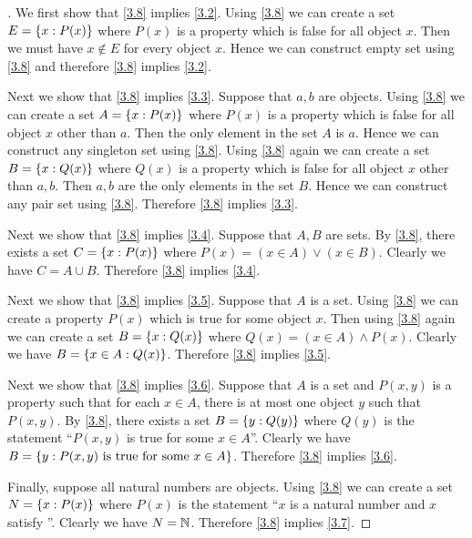 \begin{proof}[]
  We first show that \cref{3.8} implies \cref{3.2}.
  Using \cref{3.8} we can create a set \(E = \left\lbrace x : P(x)\right\rbrace\) where \(P(x)\) is a property which is false for all object \(x\).
  Then we must have \(x \notin E\) for every object \(x\).
  Hence we can construct empty set using \cref{3.8} and therefore \cref{3.8} implies \cref{3.2}.

  Next we show that \cref{3.8} implies \cref{3.3}.
  Suppose that \(a, b\) are objects.
  Using \cref{3.8} we can create a set \(A = \left\lbrace x : P(x)\right\rbrace\) where \(P(x)\) is a property which is false for all object \(x\) other than \(a\).
  Then the only element in the set \(A\) is \(a\).
  Hence we can construct any singleton set using \cref{3.8}.
  Using \cref{3.8} again we can create a set \(B = \left\lbrace x : Q(x)\right\rbrace\) where \(Q(x)\) is a property which is false for all object \(x\) other than \(a, b\).
  Then \(a, b\) are the only elements in the set \(B\).
  Hence we can construct any pair set using \cref{3.8}.
  Therefore \cref{3.8} implies \cref{3.3}.

  Next we show that \cref{3.8} implies \cref{3.4}.
  Suppose that \(A, B\) are sets.
  By \cref{3.8}, there exists a set \(C = \left\lbrace x : P(x)\right\rbrace\) where \(P(x) = (x \in A) \lor (x \in B)\).
  Clearly we have \(C = A \cup B\).
  Therefore \cref{3.8} implies \cref{3.4}.

  Next we show that \cref{3.8} implies \cref{3.5}.
  Suppose that \(A\) is a set.
  Using \cref{3.8} we can create a property \(P(x)\) which is true for some object \(x\).
  Then using \cref{3.8} again we can create a set \(B = \left\lbrace x : Q(x)\right\rbrace\) where \(Q(x) = (x \in A) \land P(x)\).
  Clearly we have \(B = \left\lbrace x \in A : Q(x)\right\rbrace\).
  Therefore \cref{3.8} implies \cref{3.5}.

  Next we show that \cref{3.8} implies \cref{3.6}.
  Suppose that \(A\) is a set and \(P(x, y)\) is a property such that for each \(x \in A\), there is at most one object \(y\) such that \(P(x, y)\).
  By \cref{3.8}, there exists a set \(B = \left\lbrace y : Q(y)\right\rbrace\) where \(Q(y)\) is the statement ``\(P(x, y)\) is true for some \(x \in A\)''.
  Clearly we have \(B = \left\lbrace y : P(x, y) \text{ is true for some } x \in A\right\rbrace\).
  Therefore \cref{3.8} implies \cref{3.6}.

  Finally, suppose all natural numbers are objects.
  Using \cref{3.8} we can create a set \(N = \left\lbrace x : P(x)\right\rbrace\) where \(P(x)\) is the statement ``\(x\) is a natural number and \(x\) satisfy ''.
  Clearly we have \(N = \mathbb{N}\).
  Therefore \cref{3.8} implies \cref{3.7}.
\end{proof}

